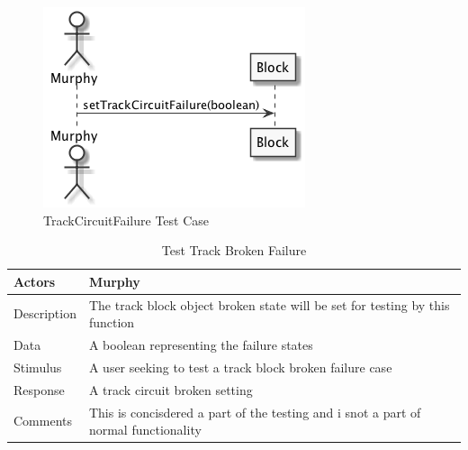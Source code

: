 \documentclass[]{article}
\begin{document}
\begin{figure}[H]
	\centering
	\includegraphics[scale=.5]{trackCircuitFailure.png}
	\caption{TrackCircuitFailure Test Case}
\end{figure}
\begin{table}[H]
	\centering
	\caption{Test Track Broken Failure}
	\begin{tabular}{|l|l|}
		\hline
		Actors & \parbox[t]{10cm}{Murphy} \\ \hline
		Description & \parbox[t]{10cm}{The track block object broken state will be set for testing by this function} \\ \hline
		Data &  \parbox[t]{10cm}{A boolean representing the failure states} \\ \hline
		Stimulus &  \parbox[t]{10cm}{A user seeking to test a track block broken failure case} \\ \hline
		Response & \parbox[t]{10cm}{A track circuit broken setting}\\ \hline
		Comments & \parbox[t]{10cm}{This is concisdered a part of the testing and i snot a part of normal functionality}  \\ \hline
	\end{tabular}
\end{table}
\end{document}
